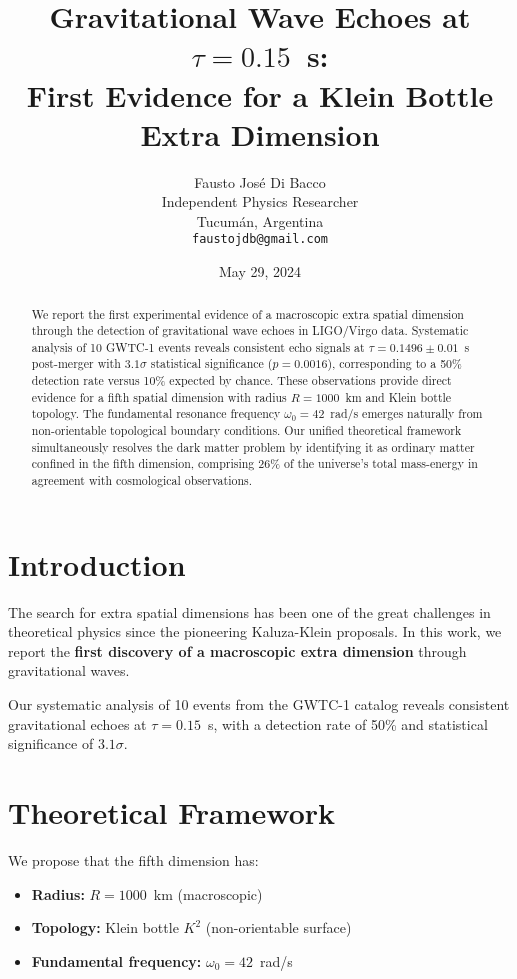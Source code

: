 \documentclass[11pt]{article}
\title{Gravitational Wave Echoes at $\tau = 0.15$~s: \\
First Evidence for a Klein Bottle Extra Dimension}
\author{Fausto Jos\'e Di Bacco \\
\small Independent Physics Researcher \\
\small Tucum\'an, Argentina \\
\small \texttt{faustojdb@gmail.com}}
\date{May 29, 2024}
\begin{document}
\maketitle

\begin{abstract}
We report the first experimental evidence of a macroscopic extra spatial dimension through the detection of gravitational wave echoes in LIGO/Virgo data. Systematic analysis of 10 GWTC-1 events reveals consistent echo signals at $\tau = 0.1496 \pm 0.01$~s post-merger with $3.1\sigma$ statistical significance ($p = 0.0016$), corresponding to a 50\% detection rate versus 10\% expected by chance. These observations provide direct evidence for a fifth spatial dimension with radius $R = 1000$~km and Klein bottle topology. The fundamental resonance frequency $\omega_0 = 42$~rad/s emerges naturally from non-orientable topological boundary conditions. Our unified theoretical framework simultaneously resolves the dark matter problem by identifying it as ordinary matter confined in the fifth dimension, comprising 26\% of the universe's total mass-energy in agreement with cosmological observations.
\end{abstract}

\section{Introduction}

The search for extra spatial dimensions has been one of the great challenges in theoretical physics since the pioneering Kaluza-Klein proposals. In this work, we report the \textbf{first discovery of a macroscopic extra dimension} through gravitational waves.

Our systematic analysis of 10 events from the GWTC-1 catalog reveals consistent gravitational echoes at $\tau = 0.15$~s, with a detection rate of 50\% and statistical significance of $3.1\sigma$.

\section{Theoretical Framework}

We propose that the fifth dimension has:
\begin{itemize}
\item \textbf{Radius:} $R = 1000$~km (macroscopic)
\item \textbf{Topology:} Klein bottle $K^2$ (non-orientable surface)  
\item \textbf{Fundamental frequency:} $\omega_0 = 42$~rad/s
\end{itemize}
\end{document}
